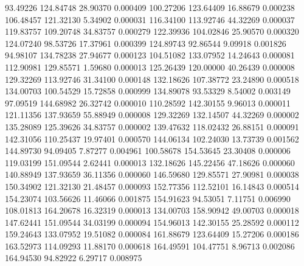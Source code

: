        93.49226      124.84748       28.90370       0.000409
      100.27206      123.64409       16.88679       0.000238
      106.48457      121.32130        5.34902       0.000031
      116.34100      113.92746       44.32269       0.000037
      119.83757      109.20748       34.83757       0.000279
      122.39936      104.02846       25.90570       0.000320
      124.07240       98.53726       17.37961       0.000399
      124.89743       92.86544        9.09918       0.001826
       94.98107      134.78238       27.94677       0.000123
      104.51082      133.07952       14.24643       0.000081
      112.90981      129.85571        1.59680       0.000013
      125.26439      120.00000       40.26439       0.000008
      129.32269      113.92746       31.34100       0.000148
      132.18626      107.38772       23.24890       0.000518
      134.00703      100.54529       15.72858       0.000999
      134.89078       93.53329        8.54002       0.003149
       97.09519      144.68982       26.32742       0.000010
      110.28592      142.30155        9.96013       0.000011
      121.11356      137.93659       55.88949       0.000008
      129.32269      132.14507       44.32269       0.000002
      135.28089      125.39626       34.83757       0.000002
      139.47632      118.02432       26.88151       0.000091
      142.31056      110.25437       19.97401       0.000570
      144.06134      102.24030       13.73739       0.001562
      144.89730       94.09405        7.87277       0.004961
      100.58678      154.53645       23.30408       0.000006
      119.03199      151.09544        2.62441       0.000013
      132.18626      145.22456       47.18626       0.000060
      140.88949      137.93659       36.11356       0.000060
      146.59680      129.85571       27.90981       0.000038
      150.34902      121.32130       21.48457       0.000093
      152.77356      112.52101       16.14843       0.000514
      154.23074      103.56626       11.46066       0.001875
      154.91623       94.53051        7.11751       0.006990
      108.01813      164.20678       16.32319       0.000013
      134.00703      158.90942       49.00703       0.000018
      147.62441      151.09544       34.03199       0.000094
      154.96013      142.30155       25.28592       0.000112
      159.24643      133.07952       19.51082       0.000084
      161.88679      123.64409       15.27206       0.000186
      163.52973      114.09293       11.88170       0.000618
      164.49591      104.47751        8.96713       0.002086
      164.94530       94.82922        6.29717       0.008975
